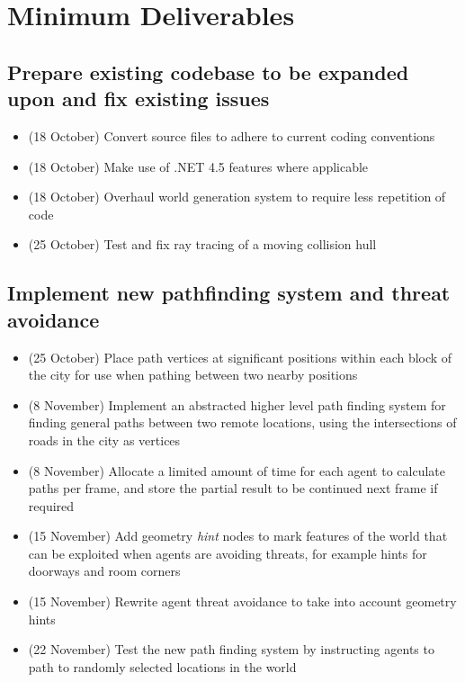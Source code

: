 \documentclass[a4paper,11pt]{article}
\begin{document}
\section{Minimum Deliverables}
\subsection{Prepare existing codebase to be expanded upon and fix existing
    issues}
    \begin{itemize}
    \item (18 October) Convert source files to adhere to current coding
        conventions
    \item (18 October) Make use of .NET 4.5 features where applicable
    \item (18 October) Overhaul world generation system to require less
        repetition of code        
    \item (25 October) Test and fix ray tracing of a moving collision hull
    \end{itemize}
\subsection{Implement new pathfinding system and threat avoidance}
    \begin{itemize}
    \item (25 October) Place path vertices at significant positions within each
        block of the city for use when pathing between two nearby positions
    \item (8 November) Implement an abstracted higher level path finding system 
        for finding general paths between two remote locations, using the
        intersections of roads in the city as vertices
    \item (8 November) Allocate a limited amount of time for each agent to
        calculate paths per frame, and store the partial result to be continued
        next frame if required 
    \item (15 November) Add geometry \emph{hint} nodes to mark features of the
        world that can be exploited when agents are avoiding threats, for
        example hints for doorways and room corners
    \item (15 November) Rewrite agent threat avoidance to take into account
        geometry hints        
    \item (22 November) Test the new path finding system by instructing agents
        to path to randomly selected locations in the world
    \end{itemize}
\end{document}
